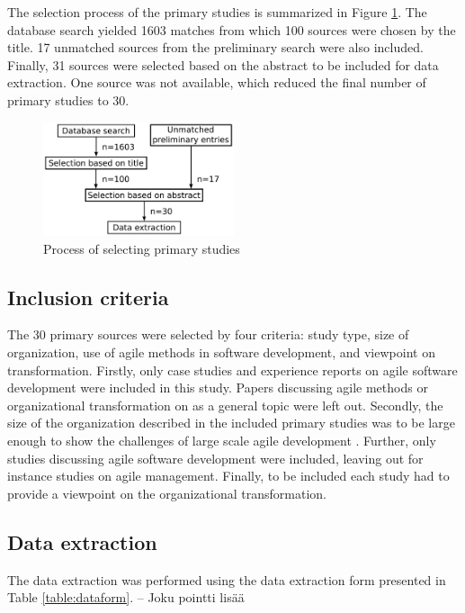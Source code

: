 \documentclass[lnbip]{svmultln}
\begin{document}
The selection process of the primary studies is summarized in Figure
\ref{fig:selection_process}. The database search yielded 1603 matches from which
100 sources were chosen by the title. 17 unmatched sources from the preliminary
search were also included. Finally, 31 sources were selected based on the
abstract to be included for data extraction. One source was not available, which
reduced the final number of primary studies to 30.

\begin{figure}[htb]
  \begin{center}
    \includegraphics[width=0.5\textwidth]{researchprocess}
    \caption{Process of selecting primary studies}
    \label{fig:selection_process}
  \end{center}
\end{figure}

\subsection{Inclusion criteria}

The 30 primary sources were selected by four criteria: study type, size of
organization, use of agile methods in software development, and viewpoint on
transformation. Firstly, only case studies and experience reports on agile
software development were included in this study. Papers discussing agile
methods or organizational transformation on as a general topic were left out.
Secondly, the size of the organization described in the included primary studies
was to be large enough to show the challenges of large scale agile development
\cite{Lindvall2004}. Further, only studies discussing agile software development
were included, leaving out for instance studies on agile management. Finally, to
be included each study had to provide a viewpoint on the organizational
transformation.

\subsection{Data extraction}

The data extraction was performed using the data extraction form presented in
Table \ref{table:dataform}. -- Joku pointti lisää
\end{document}
